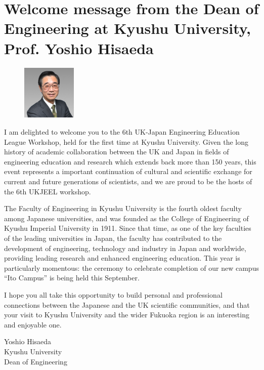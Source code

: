 \section[Welcome messages]{Welcome message from the Dean of Engineering at Kyushu University, Prof. Yoshio Hisaeda}

\begin{figure}
    \begin{center}
        \includegraphics[width=0.23\textwidth]{hisaeda.png}
    \end{center}
\end{figure}

I am delighted to welcome you to the 6th UK-Japan Engineering Education League Workshop, held for the first time at Kyushu University. Given the long history of academic collaboration between the UK and Japan in fields of engineering education and research which extends back more than 150 years, this event represents a important continuation of cultural and scientific exchange for current and future generations of scientists, and we are proud to be the hosts of the 6th UKJEEL workshop.
 
The Faculty of Engineering in Kyushu University is the fourth oldest faculty among Japanese universities, and was founded as the College of Engineering of Kyushu Imperial University in 1911. Since that time, as one of the key faculties of the leading universities in Japan, the faculty has contributed to the development of engineering, technology and industry in Japan and worldwide, providing leading research and enhanced engineering education. This year is particularly momentous: the ceremony to celebrate completion of our new campus ``Ito Campus'' is being held this September.

I hope you all take this opportunity to build personal and professional connections between the Japanese and the UK scientific communities, and that your visit to Kyushu University and the wider Fukuoka region is an interesting and enjoyable one.

\vspace{1em}
\noindent Yoshio Hisaeda\\
Kyushu University\\
Dean of Engineering


